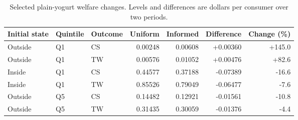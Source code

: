 \begin{table}[htbp]
\centering\small
\caption{Selected plain-yogurt welfare changes. Levels and differences are dollars per consumer over two periods.}
\label{tab:plain-welfare-examples}
\begin{tabular}{lllrrrr}
\toprule
Initial state & Quintile & Outcome & Uniform & Informed & Difference & Change (\%) \\
\midrule
Outside & Q1 & CS & 0.00248 & 0.00608 & +0.00360 & +145.0 \\
Outside & Q1 & TW & 0.00576 & 0.01052 & +0.00476 & +82.6 \\
Inside & Q1 & CS & 0.44577 & 0.37188 & -0.07389 & -16.6 \\
Inside & Q1 & TW & 0.85526 & 0.79049 & -0.06477 & -7.6 \\
Outside & Q5 & CS & 0.14482 & 0.12921 & -0.01561 & -10.8 \\
Outside & Q5 & TW & 0.31435 & 0.30059 & -0.01376 & -4.4 \\
\bottomrule
\end{tabular}
\end{table}
